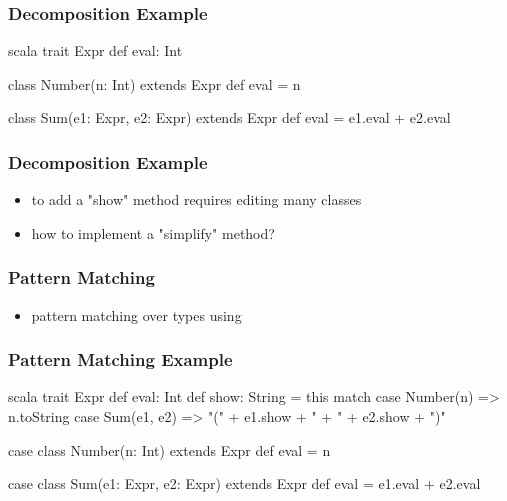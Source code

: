 \documentclass[dvipsnames]{beamer}
\theoremstyle{plain}
\begin{document}
\begin{frame}[fragile]
  \frametitle{Decomposition Example}

  \begin{example}[Scala]
    \begin{pygments}{scala}
trait Expr {
    def eval: Int
}

class Number(n: Int) extends Expr {
    def eval = n
}

class Sum(e1: Expr, e2: Expr) extends Expr {
    def eval = e1.eval + e2.eval
}
    \end{pygments}
  \end{example}
\end{frame}

\begin{frame}
  \frametitle{Decomposition Example}

  \begin{example}[Scala]
    \begin{itemize}
      \item to add a "show" method requires editing many classes
      \item how to implement a "simplify" method?
    \end{itemize}
  \end{example}
\end{frame}

\begin{frame}
  \frametitle{Pattern Matching}

  \begin{itemize}
    \item pattern matching over types using 
  \end{itemize}
\end{frame}

\begin{frame}[fragile]
  \frametitle{Pattern Matching Example}

  \begin{example}[Scala]
    \begin{pygments}{scala}
trait Expr {
    def eval: Int
    def show: String = this match {
        case Number(n) => n.toString
        case Sum(e1, e2) => "(" + e1.show + " + " + e2.show + ")"
    }
}

case class Number(n: Int) extends Expr {
    def eval = n
}

case class Sum(e1: Expr, e2: Expr) extends Expr {
    def eval = e1.eval + e2.eval
}
    \end{pygments}
  \end{example}
\end{frame}
\end{document}
